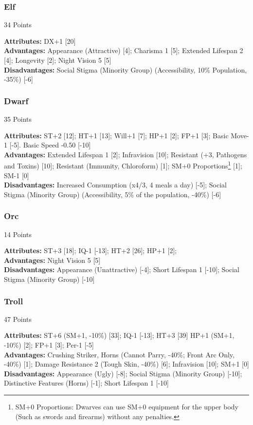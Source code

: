 \begin{multicols*}{3}
	\subsubsection*{Elf}
	\begin{flushright}
		34 Points
	\end{flushright}
	\textbf{Attributes:} 
	DX+1 [20]
	\\\textbf{Advantages:} 
	Appearance (Attractive) [4]; Charisma 1 [5]; Extended Lifespan 2 [4]; Longevity [2]; Night Vision 5 [5]
	\\\textbf{Disadvantages:} 
	Social Stigma (Minority Group) (Accessibility, 10\% Population, -35\%) [-6]
	
	\subsubsection*{Dwarf}
	\begin{flushright}
		35 Points
	\end{flushright}
	\textbf{Attributes:}
	ST+2 [12]; HT+1 [13]; Will+1 [7]; HP+1 [2]; FP+1 [3]; Basic Move-1 [-5]. Basic Speed -0.50 [-10]
	\\\textbf{Advantages:} 
	Extended Lifespan 1 [2]; Infravision [10]; Resistant (+3, Pathogens and Toxins) [10]; Resistant (Immunity, Chloroform) [1]; SM+0 Proportions\footnote{SM+0 Proportions: Dwarves can use SM+0 equipment for the upper body (Such as swords and firearms) without any penalties.} [1]; SM-1 [0]
	\\\textbf{Disadvantages:} 
	Increased Consumption (x4/3, 4 meals a day) [-5]; Social Stigma (Minority Group) (Accessibility, 5\% of the population, -40\%) [-6]
	
	\subsubsection*{Orc}
	\begin{flushright}
		14 Points
	\end{flushright}
	\textbf{Attributes:}
	ST+3 [18]; IQ-1 [-13]; HT+2 [26]; HP+1 [2];
	\\\textbf{Advantages:} 
	Night Vision 5 [5]
	\\\textbf{Disadvantages:} 
	Appearance (Unattractive) [-4]; Short Lifespan 1 [-10]; Social Stigma (Minority Group) [-10]
	
	\subsubsection*{Troll}
	\begin{flushright}
		47 Points
	\end{flushright}
	\textbf{Attributes:}
	ST+6 (SM+1, -10\%) [33]; IQ-1 [-13]; HT+3 [39] HP+1 (SM+1, -10\%) [2]; FP+1 [3]; Per-1 [-5]
	\\\textbf{Advantages:} 
	Crushing Striker, Horns (Cannot Parry, -40\%; Front Arc Only, -40\%) [1]; Damage Resistance 2 (Tough Skin, -40\%) [6]; Infravision [10]; SM+1 [0]
	\\\textbf{Disadvantages:} 
	Appearance (Ugly) [-8]; Social Stigma (Minority Group) [-10]; Distinctive Features (Horns) [-1]; Short Lifespan 1 [-10]
	

\end{multicols*}
